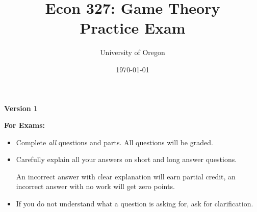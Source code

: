 \documentclass[addpoints, answers]{exam}
\title{
    \textbf{Econ 327: Game Theory} \\ 
    Practice Exam
    }
\author{University of Oregon}
\date{\today}
\begin{document}
\maketitle

\begin{center}
  \Large{\textbf{Version 1}}
\end{center}

\begin{center}
  \gradetable[h][questions]
\end{center}


% 
% 
% 
% 
%  

\begin{center}
  \textbf{For Exams:}
\end{center}

\begin{itemize}
  
  \item Complete \textit{all} questions and parts. 
  All questions will be graded.

  \item Carefully explain all your answers on short and long answer questions.

  An incorrect answer with clear explanation will earn partial credit,
  an incorrect answer with no work will get zero points.

  \item 
  If you do not understand what a question is asking for, 
  ask for clarification. 

\end{itemize}
\end{document}
